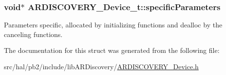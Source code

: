 \subsubsection[{\texorpdfstring{specific\+Parameters}{specificParameters}}]{\setlength{\rightskip}{0pt plus 5cm}void$\ast$ A\+R\+D\+I\+S\+C\+O\+V\+E\+R\+Y\+\_\+\+Device\+\_\+t\+::specific\+Parameters}\hypertarget{struct_a_r_d_i_s_c_o_v_e_r_y___device__t_a7240fa1d8cf4a3fb56c68b14dd2311ed}{}\label{struct_a_r_d_i_s_c_o_v_e_r_y___device__t_a7240fa1d8cf4a3fb56c68b14dd2311ed}
Parameters specific, allocated by initializing functions and dealloc by the canceling functions. 

The documentation for this struct was generated from the following file\+:\begin{DoxyCompactItemize}
\item 
src/hal/pb2/include/lib\+A\+R\+Discovery/\hyperlink{_a_r_d_i_s_c_o_v_e_r_y___device_8h}{A\+R\+D\+I\+S\+C\+O\+V\+E\+R\+Y\+\_\+\+Device.\+h}\end{DoxyCompactItemize}
